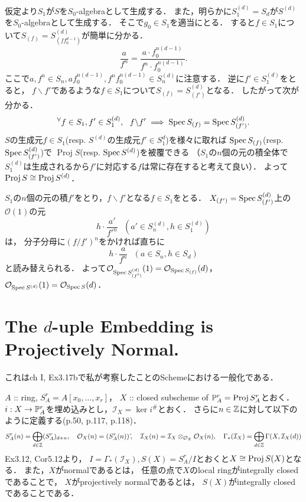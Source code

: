 \documentclass[a4paper]{jsarticle}
\newcommand{\shI}{\mathcal{I}}
\newcommand{\shO}{\mathcal{O}}
\newcommand{\Proj}{\operatorname{Proj}}
\newcommand{\sidetilde}{\,\tilde{}}
\begin{document}
    仮定より$S_{1}$が$S$を$S_0$-algebraとして生成する．
    また，明らかに$S_{1}^{(d)}=S_d$が$S^{(d)}$を$S_0$-algebraとして生成する．
    そこで$g_0 \in S_1$を適当にとる．
    すると$f \in S_1$について$S_{(f)}=S_{(f f_0^{d-1})}^{(d)}$が簡単に分かる．
    \[ \frac{a}{f^n}=\frac{a \cdot f_0^{n(d-1)}}{f^n \cdot f_0^{n(d-1)}}. \]
    ここで$a, f^n \in S_n, a f_0^{n(d-1)}, f^n f_0^{n(d-1)} \in S_n^{(d)}$に注意する．
    逆に$f' \in S_1^{(d)}$をとると，
    $f \backslash f'$であるような$f \in S_1$について$S_{(f)}=S_{(f')}^{(d)}$となる．
    したがって次が分かる．
    \[ {}^{\forall} f \in S_1, f' \in S_1^{(d)},~~ f \backslash f' \implies \operatorname{Spec} S_{(f)}=\operatorname{Spec} S_{(f')}^{(d)}. \]
    $S$の生成元$f \in S_1$(resp. $S^{(d)}$の生成元$f' \in S_1^{d}$)を様々に取れば
    $\operatorname{Spec} S_{(f)}$(resp. $\operatorname{Spec} S_{(f')}^{(d)}$)で
    $\Proj S$(resp. $\operatorname{Spec} S^{(d)}$)を被覆できる
    （$S_1$の$n$個の元の積全体で$S_1^{(d)}$は生成されるから$f'$に対応する$f$は常に存在すると考えて良い）．
    よって$\Proj S \iso \Proj S^{(d)}$．

    $S_1$の$n$個の元の積$f'$をとり，$f \backslash f'$となる$f \in S_1$をとる．
    $X_{(f')}=\operatorname{Spec} S_{(f')}^{(d)}$上の$\shO(1)$の元
    \[ h \cdot \frac{a'}{f'^n} ~~~(a' \in S_n^{(d)}, h \in S_1^{(d)}) \]は，
    分子分母に$(f/f')^n$をかければ直ちに
    \[ h \cdot \frac{a}{f^{n}} ~~~ (a \in S_{n}, h \in S_d) \]と読み替えられる．
    よって$\shO_{\Spec S_{(f')}^{(d)}}(1)=\shO_{\Spec S_{(f)}}(d)$，
    $\shO_{\Spec S^{(d)}}(1)=\shO_{\Spec S}(d)$．

\section{The $d$-uple Embedding is Projectively Normal.} %
    これはch I, Ex3.17bで私が考察したことのSchemeにおける一般化である．

    $A$ :: ring, $S_A^r=A[x_0,\dots,x_r]$，
    $X$ :: closed subscheme of $\proj^r_A=\Proj S_A^r$とおく．
    $i: X \to \mathbb{P}^r_A$を埋め込みとし，$\shI_X=\ker i^{\#}$とおく．
    さらに$n \in \mathbb{Z}$に対して以下のように定義する(p.50, p.117, p.118)．
    \[
        S_A^r(n)=\bigoplus_{d \in \Z} (S_A^r)_{d+n},~~~
        \shO_X(n)=(S_A^r(n))\sidetilde,~~~
        \shI_X(n)=\shI_X \otimes_{\shO_X} \shO_X(n),~~~
        \Gamma_*(\shI_X)=\bigoplus_{d \in \Z} \Gamma(X,\shI_X(d))
    \]
    Ex3.12, Cor5.12より，
    $I=\Gamma_*(\shI_X), S(X)=S_A^r/I$とおくと$X \iso \Proj S(X)$となる．
    また，$X$がnormalであるとは，
    任意の点で$X$のlocal ringがintegrally closedであることで，
    $X$がprojectively normalであるとは，
    $S(X)$がintegrally closedであることである．
\end{document}
